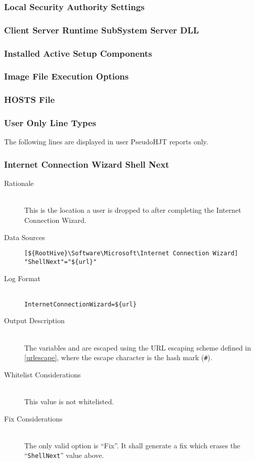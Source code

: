 \subsubsection{Local Security Authority Settings}
\subsubsection{Client Server Runtime SubSystem Server DLL}
\subsubsection{Installed Active Setup Components}
\subsubsection{Image File Execution Options}
\subsubsection{HOSTS File}

\subsubsection{User Only Line Types}
The following lines are displayed in user PseudoHJT reports only.

\subsubsection{Internet Connection Wizard Shell Next}
\begin{description}
\item[Rationale] \hfill \\
This is the location a user is dropped to after completing the Internet
Connection Wizard.
\item[Data Sources] \hfill
\vspace{-\baselineskip}
\begin{verbatim}
[${RootHive}\Software\Microsoft\Internet Connection Wizard]
"ShellNext"="${url}"
\end{verbatim}
\item[Log Format] \hfill \\
\verb|InternetConnectionWizard=${url}|
\item[Output Description] \hfill \\
The variables  and  are escaped using the URL escaping
scheme defined in \ref{urlescape}, where the escape character is the hash mark
(\verb|#|).
\item[Whitelist Considerations] \hfill \\
This value is not whitelisted.
\item[Fix Considerations] \hfill \\
The only valid option is ``Fix''. It shall generate a fix which erases the
``\verb|ShellNext|'' value above.
\end{description}

